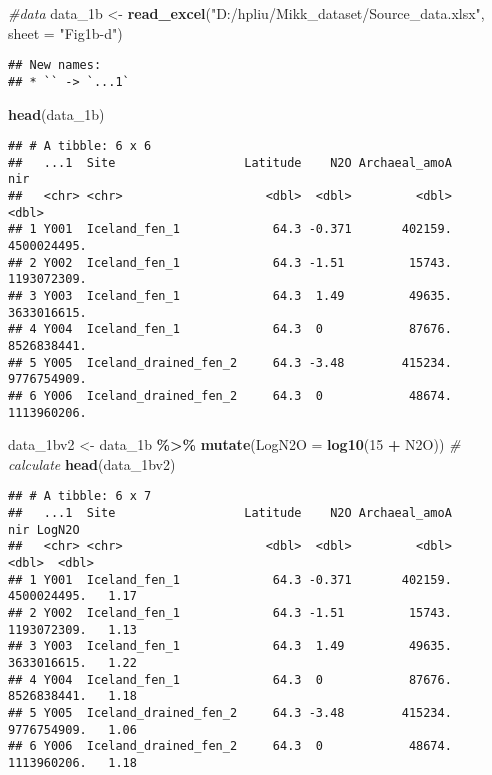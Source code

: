 \documentclass[
]{article}
\newenvironment{Shaded}{\begin{snugshade}}{\end{snugshade}}
\newcommand{\AttributeTok}[1]{\textcolor[rgb]{0.13,0.29,0.53}{#1}}
\newcommand{\CommentTok}[1]{\textcolor[rgb]{0.56,0.35,0.01}{\textit{#1}}}
\newcommand{\DecValTok}[1]{\textcolor[rgb]{0.00,0.00,0.81}{#1}}
\newcommand{\FunctionTok}[1]{\textcolor[rgb]{0.13,0.29,0.53}{\textbf{#1}}}
\newcommand{\NormalTok}[1]{#1}
\newcommand{\OtherTok}[1]{\textcolor[rgb]{0.56,0.35,0.01}{#1}}
\newcommand{\SpecialCharTok}[1]{\textcolor[rgb]{0.81,0.36,0.00}{\textbf{#1}}}
\newcommand{\StringTok}[1]{\textcolor[rgb]{0.31,0.60,0.02}{#1}}
\begin{document}
\begin{Shaded}
\begin{Highlighting}[]
\CommentTok{\#data}
\NormalTok{data\_1b }\OtherTok{\textless{}{-}} \FunctionTok{read\_excel}\NormalTok{(}\StringTok{"D:/hpliu/Mikk\_dataset/Source\_data.xlsx"}\NormalTok{, }\AttributeTok{sheet =} \StringTok{"Fig1b{-}d"}\NormalTok{)}
\end{Highlighting}
\end{Shaded}

\begin{verbatim}
## New names:
## * `` -> `...1`
\end{verbatim}

\begin{Shaded}
\begin{Highlighting}[]
\FunctionTok{head}\NormalTok{(data\_1b)}
\end{Highlighting}
\end{Shaded}

\begin{verbatim}
## # A tibble: 6 x 6
##   ...1  Site                  Latitude    N2O Archaeal_amoA         nir
##   <chr> <chr>                    <dbl>  <dbl>         <dbl>       <dbl>
## 1 Y001  Iceland_fen_1             64.3 -0.371       402159. 4500024495.
## 2 Y002  Iceland_fen_1             64.3 -1.51         15743. 1193072309.
## 3 Y003  Iceland_fen_1             64.3  1.49         49635. 3633016615.
## 4 Y004  Iceland_fen_1             64.3  0            87676. 8526838441.
## 5 Y005  Iceland_drained_fen_2     64.3 -3.48        415234. 9776754909.
## 6 Y006  Iceland_drained_fen_2     64.3  0            48674. 1113960206.
\end{verbatim}

\begin{Shaded}
\begin{Highlighting}[]
\NormalTok{data\_1bv2 }\OtherTok{\textless{}{-}}\NormalTok{ data\_1b  }\SpecialCharTok{\%\textgreater{}\%}
  \FunctionTok{mutate}\NormalTok{(}\AttributeTok{LogN2O =} \FunctionTok{log10}\NormalTok{(}\DecValTok{15} \SpecialCharTok{+}\NormalTok{ N2O)) }\CommentTok{\# calculate}
\FunctionTok{head}\NormalTok{(data\_1bv2)}
\end{Highlighting}
\end{Shaded}

\begin{verbatim}
## # A tibble: 6 x 7
##   ...1  Site                  Latitude    N2O Archaeal_amoA         nir LogN2O
##   <chr> <chr>                    <dbl>  <dbl>         <dbl>       <dbl>  <dbl>
## 1 Y001  Iceland_fen_1             64.3 -0.371       402159. 4500024495.   1.17
## 2 Y002  Iceland_fen_1             64.3 -1.51         15743. 1193072309.   1.13
## 3 Y003  Iceland_fen_1             64.3  1.49         49635. 3633016615.   1.22
## 4 Y004  Iceland_fen_1             64.3  0            87676. 8526838441.   1.18
## 5 Y005  Iceland_drained_fen_2     64.3 -3.48        415234. 9776754909.   1.06
## 6 Y006  Iceland_drained_fen_2     64.3  0            48674. 1113960206.   1.18
\end{verbatim}
\end{document}
